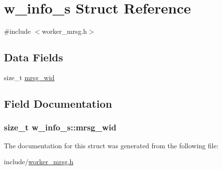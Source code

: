 \hypertarget{structw__info__s}{\section{w\-\_\-info\-\_\-s \-Struct \-Reference}
\label{structw__info__s}
}


{\ttfamily \#include $<$worker\-\_\-mrsg.\-h$>$}

\subsection*{\-Data \-Fields}
\begin{DoxyCompactItemize}
\item 
size\-\_\-t \hyperlink{structw__info__s_a4303867610d7a25a3dd96111427836b3}{mrsg\-\_\-wid}
\end{DoxyCompactItemize}


\subsection{\-Field \-Documentation}
\hypertarget{structw__info__s_a4303867610d7a25a3dd96111427836b3}{
\subsubsection[{mrsg\-\_\-wid}]{\setlength{\rightskip}{0pt plus 5cm}size\-\_\-t {\bf w\-\_\-info\-\_\-s\-::mrsg\-\_\-wid}}}\label{structw__info__s_a4303867610d7a25a3dd96111427836b3}


\-The documentation for this struct was generated from the following file\-:\begin{DoxyCompactItemize}
\item 
include/\hyperlink{worker__mrsg_8h}{worker\-\_\-mrsg.\-h}\end{DoxyCompactItemize}
